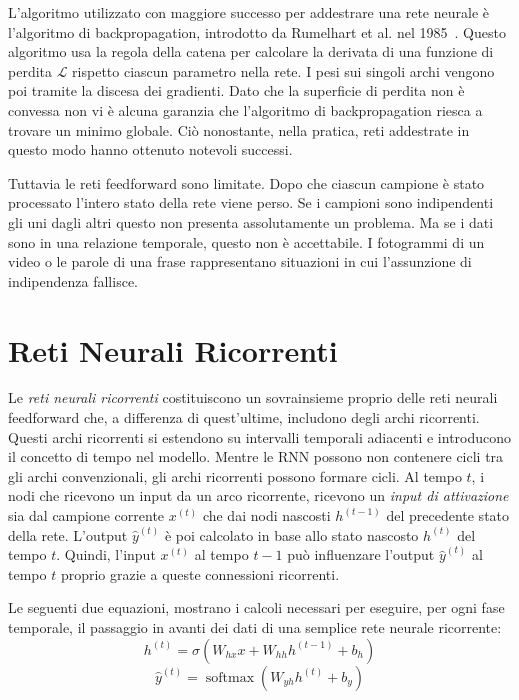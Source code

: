 L'algoritmo utilizzato con maggiore successo per addestrare una rete neurale \`e l'algoritmo di backpropagation, introdotto da Rumelhart et al. nel 1985~\cite{Rumelhart:1985}.
Questo algoritmo usa la regola della catena per calcolare la derivata di una funzione di perdita $\mathcal{L}$ rispetto ciascun parametro nella rete.
I pesi sui singoli archi vengono poi tramite la discesa dei gradienti.
Dato che la superficie di perdita non \`e convessa non vi \`e alcuna garanzia che l'algoritmo di backpropagation riesca a trovare un minimo globale.
Ci\`o nonostante, nella pratica, reti addestrate in questo modo hanno ottenuto notevoli successi.

Tuttavia le reti feedforward sono limitate.
Dopo che ciascun campione \`e stato processato l'intero stato della rete viene perso.
Se i campioni sono indipendenti gli uni dagli altri questo non presenta assolutamente un problema.
Ma se i dati sono in una relazione temporale, questo non \`e accettabile.
I fotogrammi di un video o le parole di una frase rappresentano situazioni in cui l'assunzione di indipendenza fallisce.

\section{Reti Neurali Ricorrenti}
Le \emph{reti neurali ricorrenti} costituiscono un sovrainsieme proprio delle reti neurali feedforward che, a differenza di quest'ultime, includono degli archi ricorrenti.
Questi archi ricorrenti si estendono su intervalli temporali adiacenti e introducono il concetto di tempo nel modello.
Mentre le RNN possono non contenere cicli tra gli archi convenzionali, gli archi ricorrenti possono formare cicli.
Al tempo $t$, i nodi che ricevono un input da un arco ricorrente, ricevono un \emph{input di attivazione} sia dal campione corrente $x^{(t)}$ che dai nodi nascosti $h^{(t-1)}$ del precedente stato della rete.
L'output $\hat{y}^{(t)}$ \`e poi calcolato in base allo stato nascosto $h^{(t)}$ del tempo $t$.
Quindi, l'input $x^{(t)}$ al tempo $t-1$ pu\`o influenzare l'output $\hat{y}^{(t)}$ al tempo $t$ proprio grazie a queste connessioni ricorrenti.

Le seguenti due equazioni, mostrano i calcoli necessari per eseguire, per ogni fase temporale, il passaggio in avanti dei dati di una semplice rete neurale ricorrente:
\begin{equation}
  h^{(t)} = \sigma(W_{hx}x + W_{hh}h^{(t-1)} + b_h)
\end{equation}
\begin{equation}
  \hat{y}^{(t)} = \operatorname{softmax}(W_{yh}h^{(t)} + b_y)
\end{equation}

